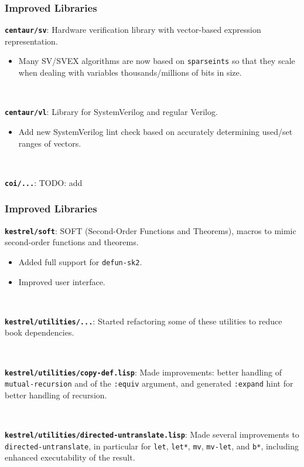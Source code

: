 \documentclass{beamer}
\newcommand{\code}[1]{\texttt{#1}}
\newcommand{\bookpath}[1]{\textbf{\code{#1}}}
\newcommand{\implibtitle}{\frametitle{Improved Libraries}}
\begin{document}

\begin{frame}

\implibtitle

\bookpath{centaur/sv}:
Hardware verification library with vector-based expression representation.
\begin{itemize}
\item
Many SV/SVEX algorithms are now based on \code{sparseints} so that they scale
when dealing with variables thousands/millions of bits in size.
\end{itemize}

\

\bookpath{centaur/vl}:
Library for SystemVerilog and regular Verilog.
\begin{itemize}
\item
Add new SystemVerilog lint check based on accurately determining
used/set ranges of vectors.
\end{itemize}

\

\bookpath{coi/...}:
TODO: add

\end{frame}


\begin{frame}

\implibtitle

\bookpath{kestrel/soft}:
SOFT (Second-Order Functions and Theorems),
macros to mimic second-order functions and theorems.
\begin{itemize}
\item
Added full support for \code{defun-sk2}.
\item
Improved user interface.
\end{itemize}

\

\bookpath{kestrel/utilities/...}:
Started refactoring some of these utilities to reduce book dependencies.

\

\bookpath{kestrel/utilities/copy-def.lisp}:
Made improvements: better handling of \code{mutual-recursion} and of
the \code{:equiv} argument, and generated \code{:expand} hint for better
handling of recursion.

\

\bookpath{kestrel/utilities/directed-untranslate.lisp}:
Made several improvements to \code{directed-untranslate}, in particular
for \code{let}, \code{let*}, \code{mv}, \code{mv-let}, and \code{b*},
including enhanced executability of the result.

\end{frame}
\end{document}
